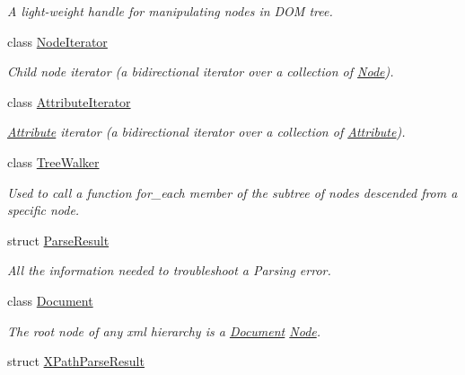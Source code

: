 \begin{DoxyCompactItemize}
\begin{DoxyCompactList}\small\item\em A light-\/weight handle for manipulating nodes in DOM tree. \item\end{DoxyCompactList}\item 
class \hyperlink{classphys_1_1xml_1_1NodeIterator}{NodeIterator}
\begin{DoxyCompactList}\small\item\em Child node iterator (a bidirectional iterator over a collection of \hyperlink{classphys_1_1xml_1_1Node}{Node}). \item\end{DoxyCompactList}\item 
class \hyperlink{classphys_1_1xml_1_1AttributeIterator}{AttributeIterator}
\begin{DoxyCompactList}\small\item\em \hyperlink{classphys_1_1xml_1_1Attribute}{Attribute} iterator (a bidirectional iterator over a collection of \hyperlink{classphys_1_1xml_1_1Attribute}{Attribute}). \item\end{DoxyCompactList}\item 
class \hyperlink{classphys_1_1xml_1_1TreeWalker}{TreeWalker}
\begin{DoxyCompactList}\small\item\em Used to call a function for\_\-each member of the subtree of nodes descended from a specific node. \item\end{DoxyCompactList}\item 
struct \hyperlink{structphys_1_1xml_1_1ParseResult}{ParseResult}
\begin{DoxyCompactList}\small\item\em All the information needed to troubleshoot a Parsing error. \item\end{DoxyCompactList}\item 
class \hyperlink{classphys_1_1xml_1_1Document}{Document}
\begin{DoxyCompactList}\small\item\em The root node of any xml hierarchy is a \hyperlink{classphys_1_1xml_1_1Document}{Document} \hyperlink{classphys_1_1xml_1_1Node}{Node}. \item\end{DoxyCompactList}\item 
struct \hyperlink{structphys_1_1xml_1_1XPathParseResult}{XPathParseResult}

\end{DoxyCompactItemize}
